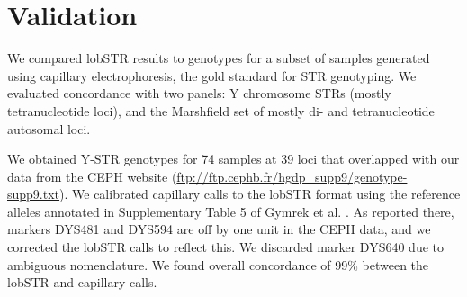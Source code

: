 \section{Validation}
We compared lobSTR results to genotypes for a subset of samples generated using capillary electrophoresis, the gold standard for STR genotyping. We evaluated concordance with two panels: Y chromosome STRs (mostly tetranucleotide loci), and the Marshfield set of mostly di- and tetranucleotide autosomal loci.

We obtained Y-STR genotypes for 74 samples at 39 loci that overlapped with our data from the CEPH website (\url{ftp://ftp.cephb.fr/hgdp_supp9/genotype-supp9.txt}). We calibrated capillary calls to the lobSTR format using the reference alleles annotated in Supplementary Table 5 of Gymrek et al. \cite{GymrekMcGuireGolanEtAl2013}. As reported there, markers DYS481 and DYS594 are off by one unit in the CEPH data, and we corrected the lobSTR calls to reflect this. We discarded marker DYS640 due to ambiguous nomenclature. We found overall concordance of 99\% between the lobSTR and capillary calls. 

